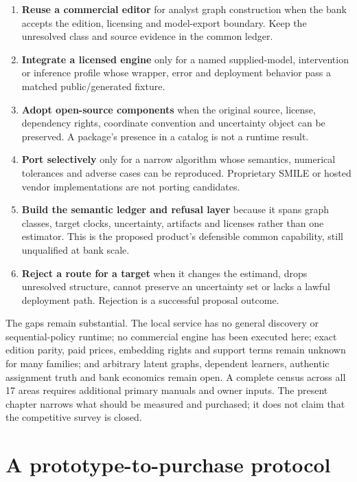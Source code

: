 \begin{enumerate}
\item \textbf{Reuse a commercial editor} for analyst graph construction when
      the bank accepts the edition, licensing and model-export boundary. Keep
      the unresolved class and source evidence in the common ledger.
\item \textbf{Integrate a licensed engine} only for a named supplied-model,
      intervention or inference profile whose wrapper, error and deployment
      behavior pass a matched public/generated fixture.
\item \textbf{Adopt open-source components} when the original source, license,
      dependency rights, coordinate convention and uncertainty object can be
      preserved. A package's presence in a catalog is not a runtime result.
\item \textbf{Port selectively} only for a narrow algorithm whose semantics,
      numerical tolerances and adverse cases can be reproduced. Proprietary
      SMILE or hosted vendor implementations are not porting candidates.
\item \textbf{Build the semantic ledger and refusal layer} because it spans
      graph classes, target clocks, uncertainty, artifacts and licenses rather
      than one estimator. This is the proposed product's defensible common
      capability, still unqualified at bank scale.
\item \textbf{Reject a route for a target} when it changes the estimand,
      drops unresolved structure, cannot preserve an uncertainty set or lacks
      a lawful deployment path. Rejection is a successful proposal outcome.
\end{enumerate}

The gaps remain substantial. The local service has no general discovery or
sequential-policy runtime; no commercial engine has been executed here; exact
edition parity, paid prices, embedding rights and support terms remain unknown
for many families; and arbitrary latent graphs, dependent learners, authentic
assignment truth and bank economics remain open. A complete census across all
17 areas requires additional primary manuals and owner inputs. The present
chapter narrows what should be measured and purchased; it does not claim that
the competitive survey is closed.

\section{A prototype-to-purchase protocol}
\label{exec17:s8-protocol}

